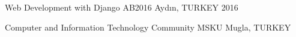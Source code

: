 \begin{cvhonors}
    \cvhonor
        {Web Development with Django}
        {AB2016}
        {Aydın, TURKEY}
        {2016}

\end{cvhonors}

\begin{cvhonors}
  \cvhonor
    {Computer and Information Technology Community}
    {MSKU}
    {Mugla, TURKEY}
    {}

\end{cvhonors}